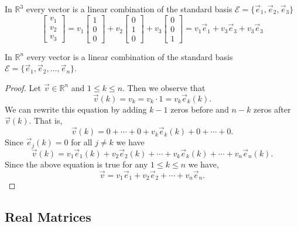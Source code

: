 \begin{example}
In $\mathbb{R}^3 $ every vector is a linear combination of the standard basis 
$\mathcal{E}=\{\vec{e}_1,\vec{e}_2,\vec{e}_3\}$
\[
\begin{bmatrix}v_1 \\ v_2 \\ v_3\end{bmatrix}=
v_1 \begin{bmatrix}1 \\ 0 \\ 0\end{bmatrix}+
v_2 \begin{bmatrix}0 \\ 1 \\ 0\end{bmatrix}+
v_3 \begin{bmatrix}0 \\ 0 \\ 1\end{bmatrix}
=v_1\vec{e}_1+v_3\vec{e}_3+v_3\vec{e}_3
\]
\end{example}

\begin{proposition}\label{prop:e_k_spans_Rn}
In $\mathbb{R}^n$ every vector is a linear combination of the standard basis 
$\mathcal{E}=\{\vec{e}_1, \vec{e}_2, \ldots, \vec{e}_n\}$.
\end{proposition}

\begin{proof}
Let $\vec{v} \in \mathbb{R}^n$ and $1\leq k\leq n$. Then we observe that  
\[\vec{v}(k)=v_k=v_k\cdot 1=v_k \vec{e}_k(k).\]
We can rewrite this equation by adding $k-1$ zeros before and $n-k$ zeros 
after $\vec{v}(k)$. That is,  
\[\vec{v}(k)=0+ \cdots + 0+v_k\vec{e}_k(k)+0+\cdots+0.\] 
Since $\vec{e}_j(k)=0$ for all $j\neq k$ we have 
\[\vec{v}(k)=v_1\vec{e}_1(k)+v_2\vec{e}_2(k)+\cdots+ v_k\vec{e}_k(k)+ \cdots + 
v_n\vec{e}_n(k).\]
Since the above equation is true for any $1\leq k\leq n$ we have,  
\[\vec{v}=v_1\vec{e}_1+v_2\vec{e}_2+\cdots+ v_n\vec{e}_n.\]
\end{proof}



\subsection{Real Matrices}

